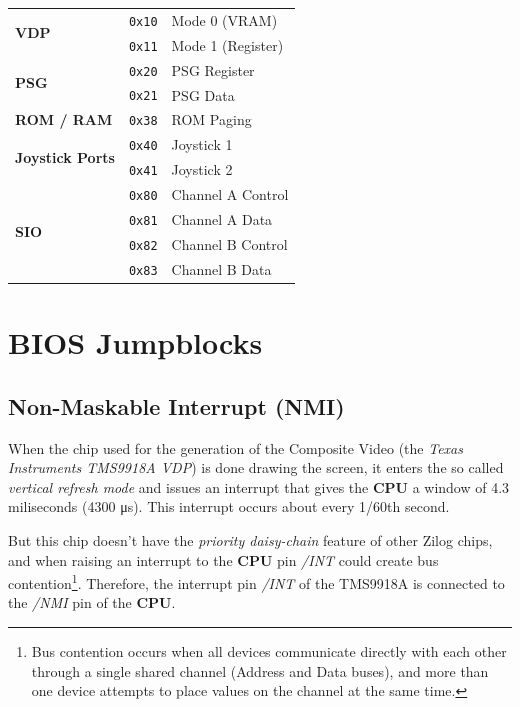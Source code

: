 \documentclass[a4paper,11pt]{article}
\begin{document}
    \begin{tabular}{l l l }
        \hline
        \multirow{2}{*}{\textbf{VDP}} & \texttt{0x10} & Mode 0 (VRAM)\\
        & \texttt{0x11} & Mode 1 (Register)\\
        \hline
        \multirow{2}{*}{\textbf{PSG}} & \texttt{0x20} & PSG Register\\
        & \texttt{0x21} & PSG Data\\
        \hline
        \textbf{ROM / RAM} & \texttt{0x38} & ROM Paging\\
        \hline
        \multirow{2}{*}{\textbf{Joystick Ports}} & \texttt{0x40} 
        & Joystick 1\\
        & \texttt{0x41} & Joystick 2\\
        \hline
        \multirow{4}{*}{\textbf{SIO}} & \texttt{0x80} & Channel A Control\\
        & \texttt{0x81} & Channel A Data\\
        & \texttt{0x82} & Channel B Control\\
        & \texttt{0x83} & Channel B Data\\
        \hline
    \end{tabular}

    \pagebreak
    \section{BIOS Jumpblocks}

    \subsection{Non-Maskable Interrupt (NMI)}
    \label{sec:nmi}

    When the chip used for the generation of the Composite Video (the \textit{Texas
    Instruments TMS9918A VDP}) is done drawing the screen, it enters the so
    called \textit{vertical refresh mode} and issues an interrupt that gives the
    \textbf{CPU} a window of 4.3 miliseconds (4300 \si{\micro\second}). This
    interrupt occurs about every 1/60th second.

    But this chip doesn't have the \textit{priority daisy-chain} feature of
    other Zilog chips, and when raising an interrupt to the \textbf{CPU} pin
    \textit{/INT} could create bus contention\footnote{Bus contention occurs
    when all devices communicate directly with each other through a single
    shared channel (Address and Data buses), and more than one device attempts
    to place values on the channel at the same time.}. Therefore, the interrupt
    pin \textit{/INT} of the TMS9918A is connected to the \textit{/NMI} pin of
    the \textbf{CPU}.
\end{document}
